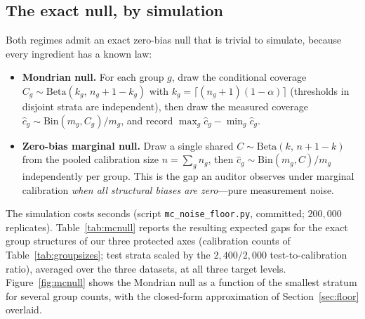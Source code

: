\documentclass[review,12pt]{elsarticle}
\begin{document}
\subsection{The exact null, by simulation}
\label{sec:mcnull}
Both regimes admit an exact zero-bias null that is trivial to simulate, because every ingredient has a known law:
\begin{itemize}
  \item \textbf{Mondrian null.} For each group $g$, draw the conditional coverage $C_g \sim \mathrm{Beta}(k_g,\, n_g+1-k_g)$ with $k_g = \lceil (n_g+1)(1-\alpha) \rceil$ (thresholds in disjoint strata are independent), then draw the measured coverage $\hat c_g \sim \mathrm{Bin}(m_g, C_g)/m_g$, and record $\max_g \hat c_g - \min_g \hat c_g$.
  \item \textbf{Zero-bias marginal null.} Draw a single shared $C \sim \mathrm{Beta}(k,\, n+1-k)$ from the pooled calibration size $n = \sum_g n_g$, then $\hat c_g \sim \mathrm{Bin}(m_g, C)/m_g$ independently per group. This is the gap an auditor observes under marginal calibration \emph{when all structural biases are zero}---pure measurement noise.
\end{itemize}
The simulation costs seconds (script \texttt{mc\_noise\_floor.py}, committed; $200{,}000$ replicates). Table~\ref{tab:mcnull} reports the resulting expected gaps for the exact group structures of our three protected axes (calibration counts of Table~\ref{tab:groupsizes}; test strata scaled by the $2{,}400/2{,}000$ test-to-calibration ratio), averaged over the three datasets, at all three target levels. Figure~\ref{fig:mcnull} shows the Mondrian null as a function of the smallest stratum for several group counts, with the closed-form approximation of Section~\ref{sec:floor} overlaid.
\end{document}
